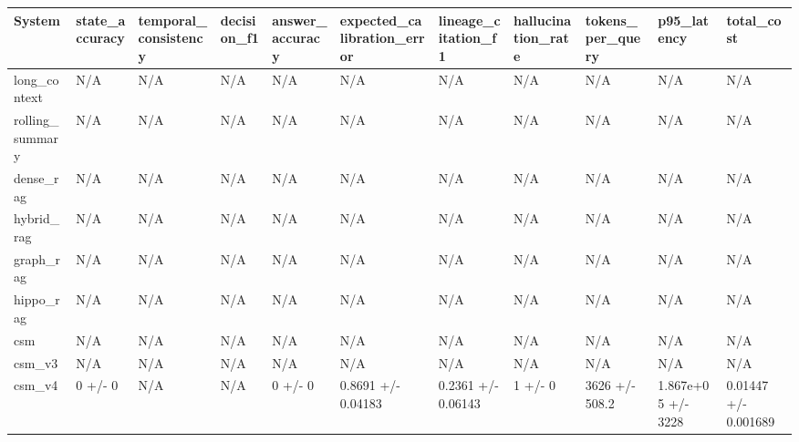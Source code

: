 \begin{tabular}{lllllllllll}
System & state_accuracy & temporal_consistency & decision_f1 & answer_accuracy & expected_calibration_error & lineage_citation_f1 & hallucination_rate & tokens_per_query & p95_latency & total_cost \\
\hline
long\_context & N/A & N/A & N/A & N/A & N/A & N/A & N/A & N/A & N/A & N/A \\
rolling\_summary & N/A & N/A & N/A & N/A & N/A & N/A & N/A & N/A & N/A & N/A \\
dense\_rag & N/A & N/A & N/A & N/A & N/A & N/A & N/A & N/A & N/A & N/A \\
hybrid\_rag & N/A & N/A & N/A & N/A & N/A & N/A & N/A & N/A & N/A & N/A \\
graph\_rag & N/A & N/A & N/A & N/A & N/A & N/A & N/A & N/A & N/A & N/A \\
hippo\_rag & N/A & N/A & N/A & N/A & N/A & N/A & N/A & N/A & N/A & N/A \\
csm & N/A & N/A & N/A & N/A & N/A & N/A & N/A & N/A & N/A & N/A \\
csm\_v3 & N/A & N/A & N/A & N/A & N/A & N/A & N/A & N/A & N/A & N/A \\
csm\_v4 & 0 +/- 0 & N/A & N/A & 0 +/- 0 & 0.8691 +/- 0.04183 & 0.2361 +/- 0.06143 & 1 +/- 0 & 3626 +/- 508.2 & 1.867e+05 +/- 3228 & 0.01447 +/- 0.001689 \\
\end{tabular}
